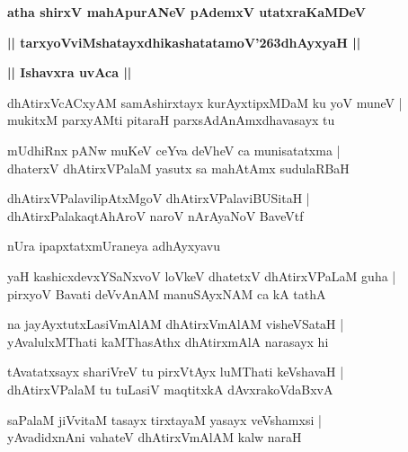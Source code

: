 \documentclass[twoside,12pt,openright]{book}
\def\S{\char'263}
\newcounter{shloka}[chapter]
\def\uvaca#1{\centerline{{\large\textbf{#1}}}}
\begin{document}
\begin{center}
{\LARGE\bfseries atha shirxV mahApurANeV pAdemxV utatxraKaMDeV}
\end{center}

\begin{center}
{\LARGE\bfseries || tarxyoVviMshatayxdhikashatatamoV\S dhAyxyaH || }
\end{center}

\uvaca{|| Ishavxra uvAca ||}

\begin{shloka}%
dhAtirxVcACxyAM samAshirxtayx kurAyxtipxMDaM ku yoV muneV |\\
mukitxM parxyAMti pitaraH parxsAdAnAmxdhavasayx tu
\end{shloka}

\begin{shloka}%
mUdhiRnx pANw muKeV ceYva deVheV ca munisatatxma |\\
dhaterxV dhAtirxVPalaM yasutx sa mahAtAmx sudulaRBaH 
\end{shloka}

\begin{shloka}%
dhAtirxVPalavilipAtxMgoV dhAtirxVPalaviBUSitaH |\\
dhAtirxPalakaqtAhAroV naroV nArAyaNoV BaveVtf
\end{shloka}

\begin{center}
nUra ipapxtatxmUraneya adhAyxyavu
\end{center}

\begin{shloka}%
yaH kashicxdevxYSaNxvoV loVkeV dhatetxV dhAtirxVPaLaM guha |\\
pirxyoV Bavati deVvAnAM manuSAyxNAM ca kA tathA 
\end{shloka}

\begin{shloka}%
na jayAyxtutxLasiVmAlAM dhAtirxVmAlAM visheVSataH |\\
yAvalulxMThati kaMThasAthx dhAtirxmAlA narasayx hi 
\end{shloka}

\begin{shloka}%
tAvatatxsayx shariVreV tu pirxVtAyx luMThati keVshavaH |\\
dhAtirxVPalaM tu tuLasiV maqtitxkA dAvxrakoVdaBxvA 
\end{shloka}

\begin{shloka}%
saPalaM jiVvitaM tasayx tirxtayaM yasayx veVshamxsi |\\
yAvadidxnAni vahateV dhAtirxVmAlAM kalw naraH 
\end{shloka}
\end{document}
